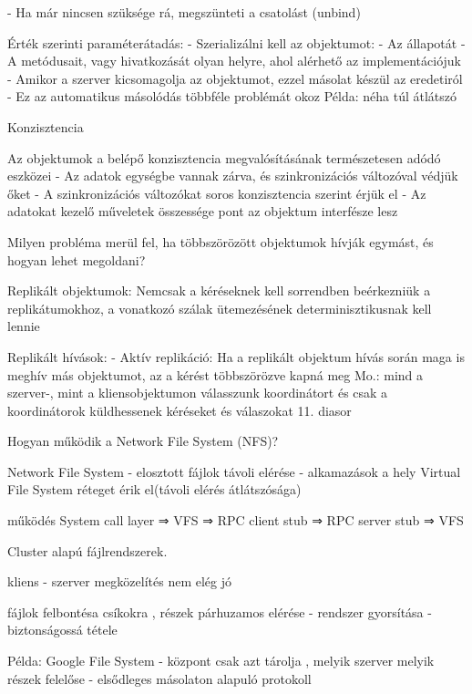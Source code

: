 \documentclass[12pt]{article}
\begin{document}
\begin{description}[style=unboxed]
        - Ha már nincsen szüksége rá, megszünteti a csatolást (unbind)
    \item Érték szerinti paraméterátadás: 
        - Szerializálni kell az objektumot:
        - Az állapotát
        - A metódusait, vagy hivatkozását olyan helyre, ahol alérhető az implementációjuk
        - Amikor a szerver kicsomagolja az objektumot, ezzel másolat készül az eredetiról
        - Ez az automatikus másolódás többféle problémát okoz Példa: néha túl átlátszó
    \item  Konzisztencia 
    \item Az objektumok a belépő konzisztencia megvalósításának természetesen adódó eszközei
        - Az adatok egységbe vannak zárva, és szinkronizációs változóval védjük őket
        - A szinkronizációs változókat soros konzisztencia szerint érjük el
        - Az adatokat kezelő műveletek összessége pont az objektum interfésze lesz
    \item  Milyen probléma merül fel, ha többszörözött objektumok hívják
        egymást, és hogyan lehet megoldani?  
    \item Replikált objektumok: Nemcsak a kéréseknek kell sorrendben beérkezniük a replikátumokhoz, a vonatkozó szálak ütemezésének
        determinisztikusnak kell lennie
    \item Replikált hívások:
        - Aktív replikáció: Ha a replikált objektum hívás során maga is meghív más objektumot, az a kérést többszörözve kapná meg
        Mo.: mind a szerver-, mint a kliensobjektumon válasszunk koordinátort és csak a koordinátorok küldhessenek kéréseket és válaszokat
        11. diasor
    \item  Hogyan működik a Network File System (NFS)?
    \item Network File System
        - elosztott fájlok távoli elérése
        - alkamazások a hely Virtual File System réteget érik el(távoli elérés átlátszósága)
    \item működés
        System call layer ⇒ VFS ⇒ RPC client stub ⇒ RPC server stub ⇒ VFS 
    \item  Cluster alapú fájlrendszerek.  
    \item kliens - szerver megközelítés nem elég jó 
    \item fájlok felbontésa csíkokra , részek párhuzamos elérése
        - rendszer gyorsítása
        - biztonságossá tétele
    \item Példa: Google File System
        - központ csak azt tárolja , melyik szerver melyik részek felelőse
        - elsődleges másolaton alapuló protokoll

\end{description}
\end{document}
